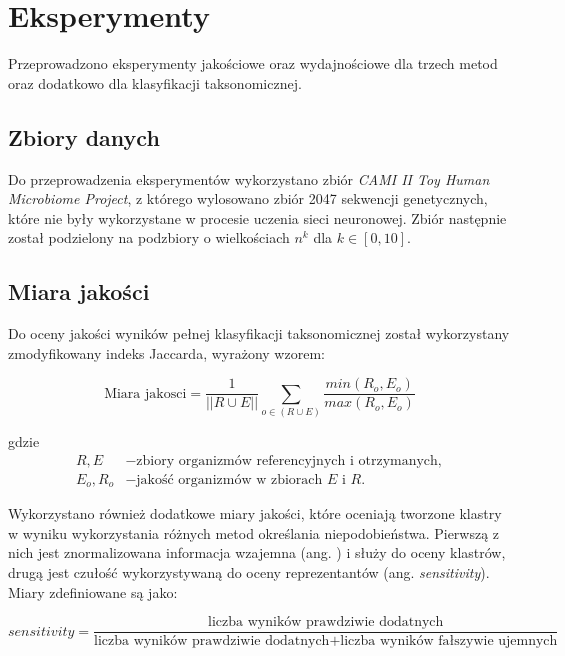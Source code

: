 \clearpage
    \section{Eksperymenty}

        Przeprowadzono eksperymenty jakościowe oraz wydajnościowe dla trzech metod oraz dodatkowo dla klasyfikacji taksonomicznej.

        \subsection{Zbiory danych}
            Do przeprowadzenia eksperymentów wykorzystano zbiór \textit{CAMI II Toy Human Microbiome Project}, z którego wylosowano zbiór 2047 sekwencji genetycznych, które nie były wykorzystane w procesie uczenia sieci neuronowej. Zbiór następnie został podzielony na podzbiory o wielkościach $n^k$ dla $k \in [0, 10]$.

        \subsection{Miara jakości}
            Do oceny jakości wyników pełnej klasyfikacji taksonomicznej został wykorzystany zmodyfikowany indeks Jaccarda, wyrażony wzorem:

            \begin{equation}
                \text{Miara jakosci} = \frac{1}{|| R \cup E||} \sum_{o \in (R \cup E)}{
                    \frac{min(R_o, E_o)}{max(R_o, E_o)}
                }
            \end{equation}
    
            gdzie 
            \begin{align*}
                R, E &- \text{zbiory organizmów referencyjnych i otrzymanych}, \\
                E_o, R_o &- \text{jakość organizmów w zbiorach } E \text{ i } R.
            \end{align*}

            Wykorzystano również dodatkowe miary jakości, które oceniają tworzone klastry w wyniku wykorzystania różnych metod określania niepodobieństwa. Pierwszą z nich jest znormalizowana informacja wzajemna (ang. ) i służy do oceny klastrów, drugą jest czułość wykorzystywaną do oceny reprezentantów (ang. \textit{sensitivity}). Miary zdefiniowane są jako:

            \begin{equation}
                sensitivity = \frac{\text{liczba wyników prawdziwie dodatnych}}{
                    \text{liczba wyników prawdziwie dodatnych} + \text{liczba wyników fałszywie ujemnych}
                }
            \end{equation}
            
